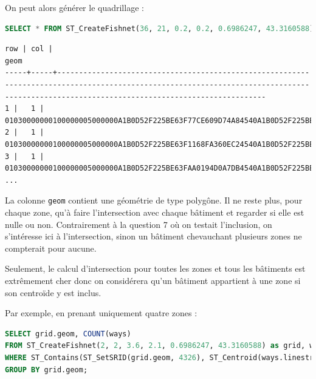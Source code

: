 \documentclass[12pt,a4paper]{article}
\begin{document}
On peut alors générer le quadrillage :

\begin{lstlisting}[language=SQL]
SELECT * FROM ST_CreateFishnet(36, 21, 0.2, 0.2, 0.6986247, 43.3160588);
\end{lstlisting}

\begin{lstlisting}
row | col |                                                                                            geom                                                                                            
-----+-----+--------------------------------------------------------------------------------------------------------------------------------------------------------------------------------------------
1 |   1 | 01030000000100000005000000A1B0D52F225BE63F77CE609D74A84540A1B0D52F225BE63F1168FA360EC2454008173C9688C1EC3F1168FA360EC2454008173C9688C1EC3F77CE609D74A84540A1B0D52F225BE63F77CE609D74A84540
2 |   1 | 01030000000100000005000000A1B0D52F225BE63F1168FA360EC24540A1B0D52F225BE63FAB0194D0A7DB454008173C9688C1EC3FAB0194D0A7DB454008173C9688C1EC3F1168FA360EC24540A1B0D52F225BE63F1168FA360EC24540
3 |   1 | 01030000000100000005000000A1B0D52F225BE63FAA0194D0A7DB4540A1B0D52F225BE63F449B2D6A41F5454008173C9688C1EC3F449B2D6A41F5454008173C9688C1EC3FAA0194D0A7DB4540A1B0D52F225BE63FAA0194D0A7DB4540
...
\end{lstlisting}

La colonne \verb?geom? contient une géométrie de type polygône. Il ne reste plus,
pour chaque zone, qu'à faire l'intersection avec chaque bâtiment et regarder si
elle est nulle ou non. Contrairement à la question 7 où on testait l'inclusion,
on s'intéresse ici à l'intersection, sinon un bâtiment chevauchant plusieurs
zones ne compterait pour aucune.

Seulement, le calcul d'intersection pour toutes les zones et tous les bâtiments
est extrêmement cher donc on considérera qu'un bâtiment appartient à une
zone si son centroïde y est inclus.

Par exemple, en prenant uniquement quatre zones :

\begin{lstlisting}[language=SQL]
SELECT grid.geom, COUNT(ways)
FROM ST_CreateFishnet(2, 2, 3.6, 2.1, 0.6986247, 43.3160588) as grid, ways
WHERE ST_Contains(ST_SetSRID(grid.geom, 4326), ST_Centroid(ways.linestring))
GROUP BY grid.geom;
\end{lstlisting}
\end{document}
